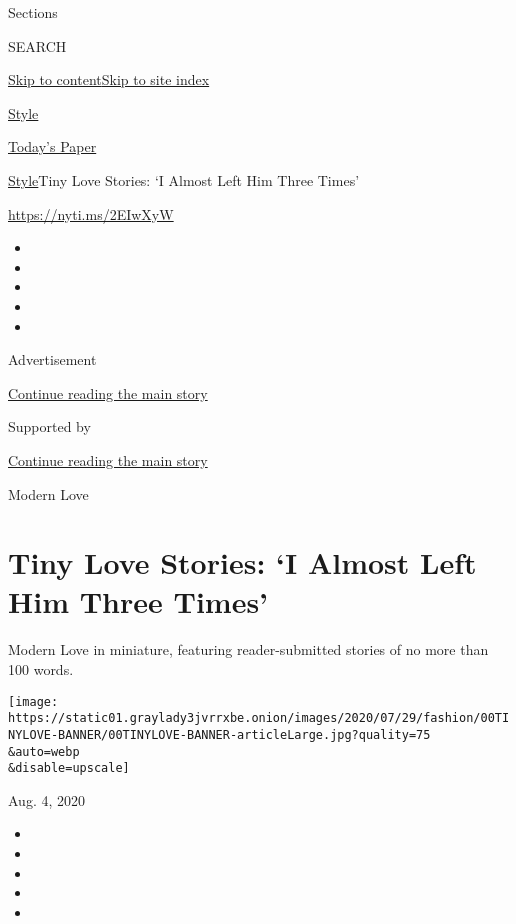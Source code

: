Sections

SEARCH

\protect\hyperlink{site-content}{Skip to
content}\protect\hyperlink{site-index}{Skip to site index}

\href{https://www.nytimes3xbfgragh.onion/section/style}{Style}

\href{https://myaccount.nytimes3xbfgragh.onion/auth/login?response_type=cookie\&client_id=vi}{}

\href{https://www.nytimes3xbfgragh.onion/section/todayspaper}{Today's
Paper}

\href{/section/style}{Style}\textbar{}Tiny Love Stories: `I Almost Left
Him Three Times'

\href{https://nyti.ms/2EIwXyW}{https://nyti.ms/2EIwXyW}

\begin{itemize}
\item
\item
\item
\item
\item
\end{itemize}

Advertisement

\protect\hyperlink{after-top}{Continue reading the main story}

Supported by

\protect\hyperlink{after-sponsor}{Continue reading the main story}

Modern Love

\hypertarget{tiny-love-stories-i-almost-left-him-three-times}{%
\section{Tiny Love Stories: `I Almost Left Him Three
Times'}\label{tiny-love-stories-i-almost-left-him-three-times}}

Modern Love in miniature, featuring reader-submitted stories of no more
than 100 words.

\texttt{[image: https://static01.graylady3jvrrxbe.onion/images/2020/07/29/fashion/00TINYLOVE-BANNER/00TINYLOVE-BANNER-articleLarge.jpg?quality=75\\\&auto=webp\\\&disable=upscale]}

Aug. 4, 2020

\begin{itemize}
\item
\item
\item
\item
\item
\end{itemize}

